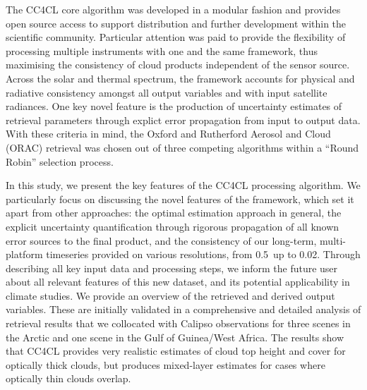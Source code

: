 The CC4CL core algorithm was developed in a modular fashion
and provides open source access to support distribution and further development within the
scientific community. Particular attention was paid to provide the flexibility of processing multiple instruments
with one and the same framework, thus maximising the consistency of
cloud products independent of the sensor source. Across the solar and thermal spectrum, the framework
accounts for physical and radiative consistency amongst all output variables and with
input satellite radiances. One key novel feature is the production of uncertainty
estimates of retrieval parameters through explict error propagation from input to output data. With these criteria in mind, the Oxford and Rutherford Aerosol and
Cloud (ORAC) retrieval \citep{Thomas09, Poulsen12} was chosen out of three competing algorithms within a ``Round Robin'' selection process. 

In this study, we present the key features of the CC4CL processing algorithm. We particularly focus on discussing the novel features of the framework, which set it apart from other approaches: the optimal estimation approach in general, the explicit uncertainty quantification through rigorous propagation of all known error sources to the final product, and the consistency of our long-term, multi-platform timeseries provided on various resolutions, from 0.5\textdegree\ up to 0.02\textdegree. Through describing all key input data and processing steps, we inform the future user about all relevant features of this new dataset, and its potential applicability in climate studies. We provide an overview of the retrieved and derived output variables. These are initially validated in a comprehensive and detailed analysis of retrieval results that we collocated with Calipso observations for three scenes in the Arctic and one scene in the Gulf of Guinea/West Africa. The results show that CC4CL provides very realistic estimates of cloud top height and cover for optically thick clouds, but produces mixed-layer estimates for cases where optically thin clouds overlap. %


